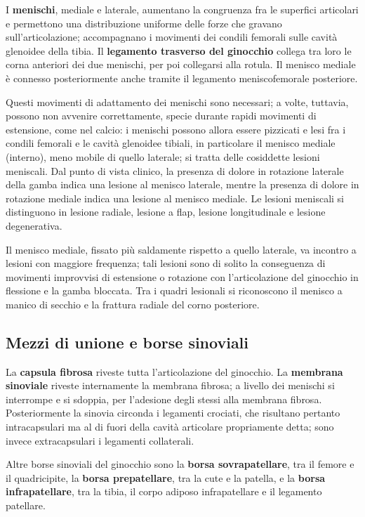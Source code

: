 I \textbf{menischi}, mediale e laterale, aumentano la congruenza fra le
superfici articolari e permettono una distribuzione uniforme delle forze
che gravano sull'articolazione; accompagnano i movimenti dei condili
femorali sulle cavità glenoidee della tibia. Il \textbf{legamento trasverso
del ginocchio} collega tra loro le corna anteriori dei due menischi, per
poi collegarsi alla rotula. Il menisco mediale è connesso posteriormente
anche tramite il legamento meniscofemorale posteriore.

Questi movimenti di adattamento dei menischi sono necessari; a volte,
tuttavia, possono non avvenire correttamente, specie durante rapidi
movimenti di estensione, come nel calcio: i menischi possono allora
essere pizzicati e lesi fra i condili femorali e le cavità glenoidee
tibiali, in particolare il menisco mediale (interno), meno mobile di
quello laterale; si tratta delle cosiddette lesioni meniscali. Dal punto
di vista clinico, la presenza di dolore in rotazione laterale della gamba
indica una lesione al menisco laterale, mentre la presenza di dolore in
rotazione mediale indica una lesione al menisco mediale. Le lesioni
meniscali si distinguono in lesione radiale, lesione a flap, lesione
longitudinale e lesione degenerativa.

Il menisco mediale, fissato più saldamente rispetto a quello laterale, va
incontro a lesioni con maggiore frequenza; tali lesioni sono di solito la
conseguenza di movimenti improvvisi di estensione o rotazione con
l'articolazione del ginocchio in flessione e la gamba bloccata. Tra i
quadri lesionali si riconoscono il menisco a manico di secchio e la
frattura radiale del corno posteriore.

\subsection{Mezzi di unione e borse sinoviali}

La \textbf{capsula fibrosa} riveste tutta l'articolazione del ginocchio. La
\textbf{membrana sinoviale} riveste internamente la membrana fibrosa; a
livello dei menischi si interrompe e si sdoppia, per l'adesione degli
stessi alla membrana fibrosa. Posteriormente la sinovia circonda i
legamenti crociati, che risultano pertanto intracapsulari ma al di fuori
della cavità articolare propriamente detta; sono invece extracapsulari i
legamenti collaterali.

Altre borse sinoviali del ginocchio sono la \textbf{borsa sovrapatellare},
tra il femore e il quadricipite, la \textbf{borsa prepatellare}, tra la
cute e la patella, e la \textbf{borsa infrapatellare}, tra la tibia, il
corpo adiposo infrapatellare e il legamento patellare.

